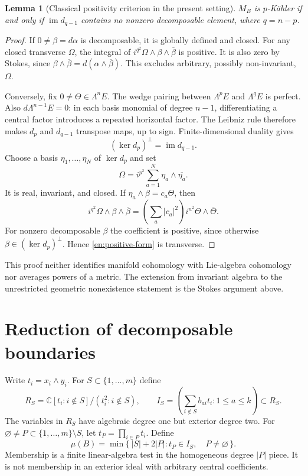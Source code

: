 \documentclass[12pt]{amsart}
\newcommand{\lemword}{Lemma}
\newtheorem{lem}[thm]{\lemword}
\theoremstyle{definition}
\theoremstyle{remark}
\numberwithin{equation}{section}
\newcommand{\C}{\mathbb{C}}
\begin{document}
\begin{lem}[Classical positivity criterion in the present setting]
\label{en:positivity}
$M_B$ is $p$-K\"ahler if and only if $\operatorname{im}d_{q-1}$ contains no
nonzero decomposable element, where $q=n-p$.
\end{lem}
\begin{proof}
If $0\ne\beta=d\alpha$ is decomposable, it is globally defined and closed.
For any closed transverse $\Omega$, the integral of
$i^{q^2}\Omega\wedge\beta\wedge\overline\beta$ is positive. It is also zero
by Stokes, since $\beta\wedge\overline\beta=d(\alpha\wedge\overline\beta)$.
This excludes arbitrary, possibly non-invariant, $\Omega$.

Conversely, fix $0\ne\Theta\in\Lambda^nE$. The wedge pairing between
$\Lambda^pE$ and $\Lambda^qE$ is perfect. Also $d\Lambda^{n-1}E=0$:
in each basis monomial of degree $n-1$, differentiating a central factor
introduces a repeated horizontal factor. The Leibniz rule therefore makes
$d_p$ and $d_{q-1}$ transpose maps, up to sign. Finite-dimensional duality gives
\[
 (\ker d_p)^\perp=\operatorname{im}d_{q-1}.
\]
Choose a basis $\eta_1,\ldots,\eta_N$ of $\ker d_p$ and set
\begin{equation}\label{en:positive-form}
 \Omega=i^{p^2}\sum_{a=1}^N\eta_a\wedge\overline{\eta_a}.
\end{equation}
It is real, invariant, and closed. If $\eta_a\wedge\beta=c_a\Theta$, then
\[
 i^{q^2}\Omega\wedge\beta\wedge\overline\beta
 =\left(\sum_a|c_a|^2\right)i^{n^2}\Theta\wedge\overline\Theta.
\]
For nonzero decomposable $\beta$ the coefficient is positive, since otherwise
$\beta\in(\ker d_p)^\perp$. Hence \eqref{en:positive-form} is transverse.
\end{proof}

This proof neither identifies manifold cohomology with Lie-algebra
cohomology nor averages powers of a metric. The extension from invariant
algebra to the unrestricted geometric nonexistence statement is the Stokes
argument above.

\section{Reduction of decomposable boundaries}\label{en:boundary-section}
Write $t_i=x_i\wedge y_i$. For $S\subset\{1,\ldots,m\}$ define
\[
 R_S=\C[t_i:i\notin S]/(t_i^2:i\notin S),\qquad
 I_S=\left(\sum_{i\notin S}b_{ai}t_i:1\leq a\leq k\right)\subset R_S.
\]
The variables in $R_S$ have algebraic degree one but exterior degree two.
For $\varnothing\ne P\subset\{1,\ldots,m\}\setminus S$, let
$t_P=\prod_{i\in P}t_i$. Define
\begin{equation}\label{en:mu}
 \mu(B)=\min\{\,|S|+2|P|:t_P\in I_S,\quad P\ne\varnothing\,\}.
\end{equation}
Membership is a finite linear-algebra test in the homogeneous degree $|P|$
piece. It is not membership in an exterior ideal with arbitrary central
coefficients.
\end{document}
